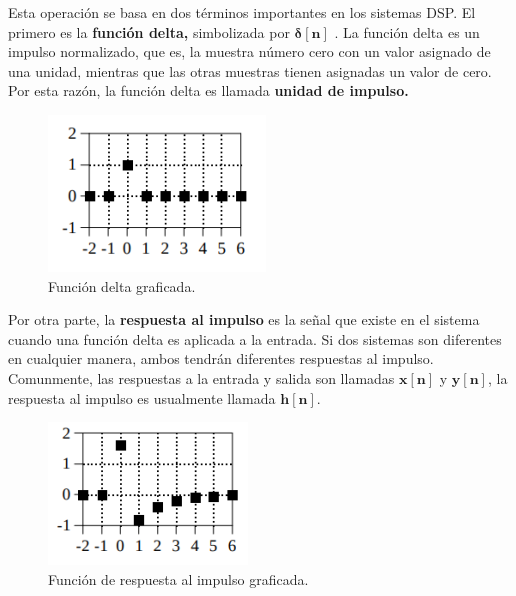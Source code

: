 Esta operaci\'{o}n se basa en dos t\'{e}rminos importantes en los
sistemas DSP. El primero es la \textbf{funci\'{o}n delta, }simbolizada
por $\mathbf{\mathbf{\mathbf{\delta}[n]}}$ . La funci\'{o}n delta
es un impulso normalizado, que es, la muestra n\'{u}mero cero con
un valor asignado de una unidad, mientras que las otras muestras tienen
asignadas un valor de cero. Por esta raz\'{o}n, la funci\'{o}n delta
es llamada \textbf{unidad de impulso.} 

\begin{figure}[H]
\begin{centering}
\includegraphics[scale=0.9]{img/delta}
\par\end{centering}
\caption{Funci\'{o}n \foreignlanguage{english}{delta graficada.}}

\end{figure}

Por otra parte, la \textbf{respuesta al impulso} es la se\~{n}al que
existe en el sistema cuando una funci\'{o}n delta es aplicada a la
entrada. Si dos sistemas son diferentes en cualquier manera, ambos
tendr\'{a}n diferentes respuestas al impulso. Comunmente, las respuestas
a la entrada y salida son llamadas $\mathbf{x[n]}$ y $\mathbf{y[n]}$,
la respuesta al impulso es usualmente llamada $\mathbf{h[n]}$. 

\begin{figure}[H]
\begin{centering}
\includegraphics[scale=0.9]{img/impulse}
\par\end{centering}
\caption{Funci\'{o}n \foreignlanguage{english}{de respuesta al impulso graficada.}}
\end{figure}

